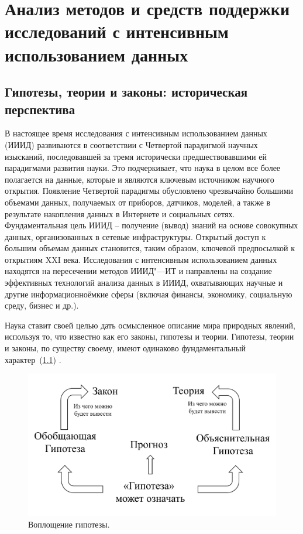 \chapter{Анализ методов и средств поддержки исследований с интенсивным использованием данных} \label{chapt1}

\section{Гипотезы, теории и законы: историческая перспектива} \label{sect1_1}

В настоящее время исследования с интенсивным использованием данных (ИИИД) развиваются в соответствии с Четвертой 
парадигмой \cite{Hey2009} научных изысканий, последовавшей за тремя исторически предшествовавшими ей парадигмами 
развития науки. Это подчеркивает, что наука в целом все более полагается на данные, которые и являются ключевым 
источником научного открытия. Появление Четвертой парадигмы обусловлено чрезвычайно большими объемами данных, 
получаемых от приборов, датчиков, моделей, а также в результате накопления данных в Интернете и социальных сетях. 
Фундаментальная цель ИИИД – получение (вывод) знаний на основе совокупных данных, организованных в сетевые 
инфраструктуры. Открытый доступ к большим объемам данных становится, таким образом, ключевой предпосылкой к открытиям 
XXI века. Исследования с интенсивным использованием данных находятся на пересечении методов ИИИД"---ИТ и направлены 
на создание эффективных технологий анализа данных в ИИИД, охватывающих научные и другие информационноёмкие сферы 
(включая финансы, экономику, социальную среду, бизнес и др.).

Наука ставит своей целью дать осмысленное описание мира природных явлений, используя то, что известно как его законы, 
гипотезы и теории. Гипотезы, теории и законы, по существу своему, имеют одинаково фундаментальный 
характер~(\cref{fig:hypothesis_repr}) \cite{McComas2005}. 

\begin{figure}[ht]
    \centering
    \includegraphics[width=0.7\linewidth]{images/hypothesis_life.pdf}
    \caption{Воплощение гипотезы.}\label{fig:hypothesis_repr}
\end{figure}

